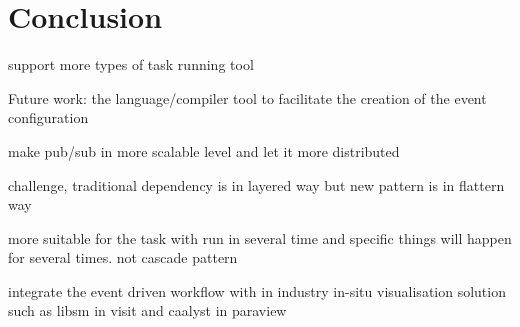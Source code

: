 \section{Conclusion}

support more types of task running tool

Future work: the language/compiler tool to facilitate the creation of the event configuration

make pub/sub in more scalable level and let it more distributed

challenge, traditional dependency is in layered way but new pattern is in flattern way

more suitable for the task with run in several time and specific things will happen for several times. not cascade pattern

integrate the event driven workflow with in industry in-situ visualisation solution such as libsm in visit and caalyst in paraview